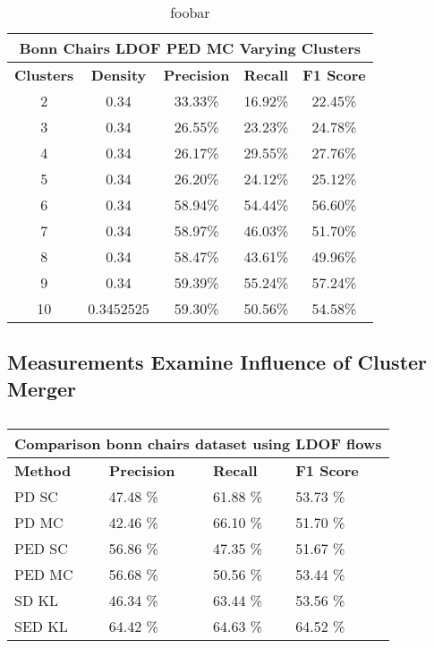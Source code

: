\begin{table}[H]
\centering
\begin{tabular}{|c|c|c|c|c|}
\hline
\multicolumn{5}{|c|}{Bonn Chairs LDOF PED MC Varying Clusters}                        \\ \hline
\textbf{Clusters} & \textbf{Density} & \textbf{Precision} & \textbf{Recall} & \textbf{F1 Score} \\ \hline
2 & 0.34 & 33.33\%   & 16.92\%     & 22.45\%  \\ \hline
3 & 0.34 & 26.55\%   & 23.23\%     & 24.78\%  \\ \hline
4 & 0.34 & 26.17\%   & 29.55\%     & 27.76\%  \\ \hline
5 & 0.34 & 26.20\%   & 24.12\%     & 25.12\%  \\ \hline
6 & 0.34 & 58.94\%   & 54.44\%     & 56.60\%  \\ \hline
7 & 0.34 & 58.97\%   & 46.03\%     & 51.70\%  \\ \hline
8 & 0.34 & 58.47\%   & 43.61\%     & 49.96\%  \\ \hline
9 & 0.34 & 59.39\%   & 55.24\%     & 57.24\%  \\ \hline              
10 & 0.3452525  & 59.30\%   & 50.56\%     & 54.58\%  \\ \hline
\end{tabular}
\caption[Bonn Chairs PED MC Varying Clusters]{foobar}
\label{tab:bonn_chairs_ldof_sed_c_6_9_10_eval_ped_mc}
\end{table}

\subsection{Measurements Examine Influence of Cluster Merger}
\begin{table}[H]
\centering
\begin{tabular}{|l|l|l|l|}
\hline
\multicolumn{4}{|c|}{Comparison bonn chairs dataset using LDOF flows}                        \\ \hline
\textbf{Method} & \textbf{Precision} & \textbf{Recall} & \textbf{F1 Score} \\ \hline
PD SC & 47.48 \%   & 61.88 \%     & 53.73 \%  \\ \hline
PD MC & 42.46 \%   & 66.10 \%     & 51.70 \%    \\ \hline
PED SC & 56.86 \%   & 47.35 \%     & 51.67 \%    \\ \hline
PED MC & 56.68 \%   & 50.56 \%     & 53.44 \%     \\ \hline              
SD KL & 46.34 \%   & 63.44 \%     & 53.56 \%     \\ \hline
SED KL & 64.42 \%   & 64.63 \%     & 64.52 \%    \\ \hline
\end{tabular}
\caption[Statistics Bonn Chairs Frame 30]{}
\label{tab:eval_stat_raw_merged}
\end{table}


